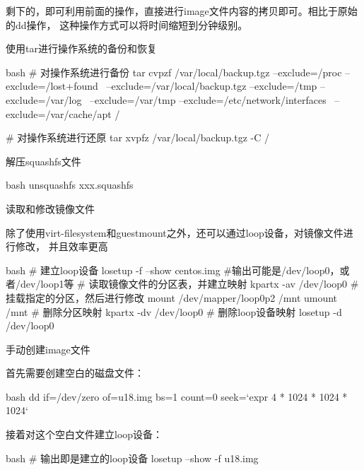 \begin{outline}[enumerate]
剩下的，即可利用前面的操作，直接进行image文件内容的拷贝即可。相比于原始的dd操作，
这种操作方式可以将时间缩短到分钟级别。

\1 使用tar进行操作系统的备份和恢复
\begin{code-block}{bash}
# 对操作系统进行备份
tar cvpzf /var/local/backup.tgz --exclude=/proc --exclude=/lost+found \
    --exclude=/var/local/backup.tgz --exclude=/tmp --exclude=/var/log \
    --exclude=/var/tmp --exclude=/etc/network/interfaces \
    --exclude=/var/cache/apt /

# 对操作系统进行还原
tar xvpfz /var/local/backup.tgz -C /
\end{code-block}

\1 解压squashfs文件
\begin{code-block}{bash}
unsquashfs xxx.squashfs
\end{code-block}

\1 读取和修改镜像文件

除了使用virt-filesystem和guestmount之外，还可以通过loop设备，对镜像文件进行修改，
并且效率更高
\begin{code-block}{bash}
# 建立loop设备
losetup -f --show centos.img #输出可能是/dev/loop0，或者/dev/loop1等
# 读取镜像文件的分区表，并建立映射
kpartx -av /dev/loop0
# 挂载指定的分区，然后进行修改
mount /dev/mapper/loop0p2 /mnt
umount /mnt
# 删除分区映射
kpartx -dv /dev/loop0
# 删除loop设备映射
losetup -d /dev/loop0
\end{code-block}

\1 手动创建image文件

首先需要创建空白的磁盘文件：
\begin{code-block}{bash}
dd if=/dev/zero of=u18.img bs=1 count=0 seek=`expr 4 * 1024 * 1024 * 1024`
\end{code-block}

接着对这个空白文件建立loop设备：
\begin{code-block}{bash}
# 输出即是建立的loop设备
losetup --show -f u18.img
\end{code-block}


\end{outline}
